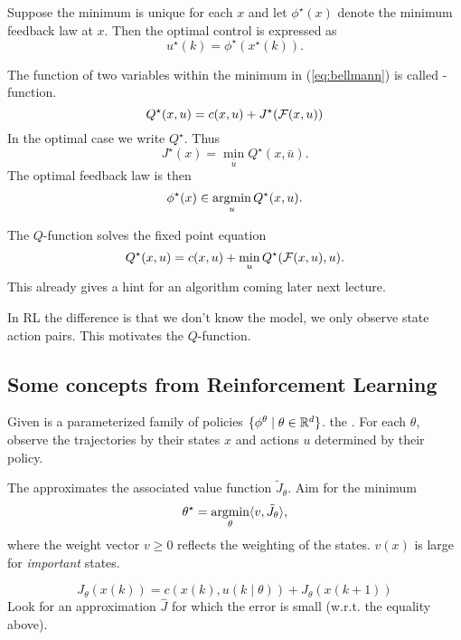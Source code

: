 Suppose the minimum is unique for each \(x\) and let \(\phi^\star(x)\) denote 
the minimum feedback law at \(x\). Then the optimal control is expressed as 
\[u^\star(k)=\phi^\star(x^\star(k)).\]

\begin{definition}[Q-function]\label{def:1.14}
    The function of two variables within the minimum in (\ref{eq:bellmann}) is called -function.
    \[Q^\star(x,u)=c(x,u)+J^\star(\mathcal{F}(x,u))\]
    In the optimal case we write \(Q^\star\). Thus 
    \[J^\star(x)=\min_{\bar{u}}Q^\star(x,\bar{u}).\] 
    The optimal feedback law is then 
    \[\phi^\star(x)\in\operatorname*{\text{argmin}}_{u}Q^\star(x,u).\]    
\end{definition} %

The \(Q\)-function solves the fixed point equation 
\[Q^\star(x,u)=c(x,u)+\min_{u}Q^\star(\mathcal{F}(x,u),u).\]
This already gives a hint for an algorithm coming later next lecture.

\begin{remark}
    In RL the difference is that we don't know the model, we only observe state action pairs.
    This motivates the \(Q\)-function.        
\end{remark}

\subsection*{Some concepts from Reinforcement Learning}


Given is a parameterized family of policies \(\{\phi^\theta\mid \theta\in \mathbb{R}^d\}\).
the . For each \(\theta\), observe the trajectories by their states 
\(x\) and actions \(u\) determined by their policy.

The  approximates the associated value function 
\(\tilde{J}_\theta\). Aim for the minimum 
\[\theta^\star=\operatorname*{\text{argmin}}_{\theta}\langle v, \tilde{J}_\theta \rangle,\]
where the weight vector \(v\geq 0\) reflects the weighting of the states. \(v(x)\) is large for \textit{important} states.


\[J_\theta(x(k))=c(x(k),u(k\mid\theta))+J_\theta(x(k+1))\]
Look for an approximation \(\hat{J}\) for which the error is small (w.r.t. the equality above).

